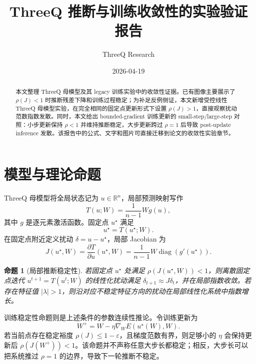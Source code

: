 \documentclass[UTF8,zihao=-4]{ctexart}
\title{ThreeQ 推断与训练收敛性的实验验证报告}
\author{ThreeQ Research}
\date{2026-04-19}
\newtheorem{proposition}{命题}
\begin{document}
\maketitle

\begin{abstract}
本文整理 ThreeQ 母模型及其 legacy 训练实验中的收敛性证据。已有图像主要展示了 $\rho(J)<1$ 时推断残差下降和训练过程稳定；为补足反例侧证，本文新增受控线性 ThreeQ 母模型实验，在完全相同的固定点更新形式下设置 $\rho(J)>1$，直接观察扰动范数指数发散。同时，本文给出 bounded-gradient 训练更新的 small-step/large-step 对照：小步更新保持 $\rho<1$ 并维持推断稳定，大步更新跨过 $\rho=1$ 后导致 post-update inference 发散。该报告中的公式、文字和图片可直接迁移到论文的收敛性实验章节。
\end{abstract}

\section{模型与理论命题}

ThreeQ 母模型将全局状态记为 $u\in\mathbb{R}^n$，局部预测映射写作
\begin{equation}
T(u;W)=\frac{1}{n-1}Wg(u),
\end{equation}
其中 $g$ 是逐元素激活函数。固定点 $u^\star$ 满足
\begin{equation}
u^\star=T(u^\star;W).
\end{equation}
在固定点附近定义扰动 $\delta=u-u^\star$，局部 Jacobian 为
\begin{equation}
J(u^\star,W)=\frac{\partial T}{\partial u}(u^\star,W)
       =\frac{1}{n-1}W\operatorname{diag}(g'(u^\star)).
\end{equation}

\begin{proposition}[局部推断稳定性]
若固定点 $u^\star$ 处满足 $\rho(J(u^\star,W))<1$，则离散固定点迭代 $u^{t+1}=T(u^t;W)$ 的线性化扰动满足 $\delta_{t+1}\approx J\delta_t$，并在局部指数收敛。若存在特征值 $|\lambda|>1$，则沿对应不稳定特征方向的扰动在局部线性化系统中指数增长。
\end{proposition}

训练稳定性命题则是上述条件的参数连续性推论。令训练更新为
\begin{equation}
W^+=W-\eta \nabla_W E(u^\star(W),W).
\end{equation}
若当前点存在稳定裕度 $\rho(J)\le 1-\varepsilon$，且梯度范数有界，则足够小的 $\eta$ 会保持更新后 $\rho(J(W^+))<1$。该命题并不声称任意大步长都稳定；相反，大步长可以把系统推过 $\rho=1$ 的边界，导致下一轮推断不稳定。
\end{document}

